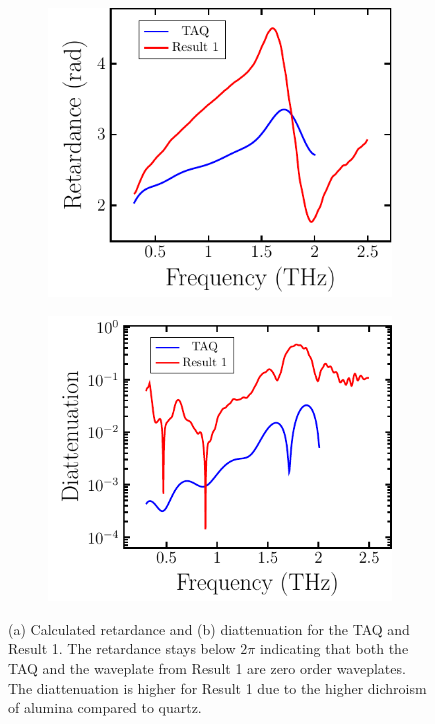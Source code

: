 \begin{figure}[H]
    \begin{subfigure}[b]{.5\linewidth}
    \caption{}\label{}
    \centering\includegraphics[scale=0.59]{images/results/plots/ceramic/ret_and_diat_a.pdf}
    \end{subfigure}%
    \begin{subfigure}[b]{.5\linewidth}
    \caption{}\label{}
    \centering\includegraphics[scale=0.59]{images/results/plots/ceramic/ret_and_diat_b.pdf}
    \end{subfigure}
    \caption{(a) Calculated retardance and (b) diattenuation for the TAQ and Result 1. The retardance stays below $2\pi$ indicating that both the TAQ and the waveplate from Result 1 are zero order waveplates. The diattenuation is higher for Result 1 due to the higher dichroism of alumina compared to quartz.}
    \label{fig:cl4_ret_diat}
\end{figure}

